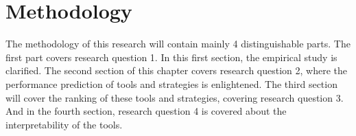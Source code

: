 \chapter{Methodology}
\label{chap:methodology}
The methodology of this research will contain mainly 4 distinguishable parts. The first part covers research question 1. In this first section, the empirical study is clarified. The second section of this chapter covers research question 2, where the performance prediction of tools and strategies is enlightened. The third section will cover the ranking of these tools and strategies, covering research question 3. And in the fourth section, research question 4 is covered about the interpretability of the tools.




